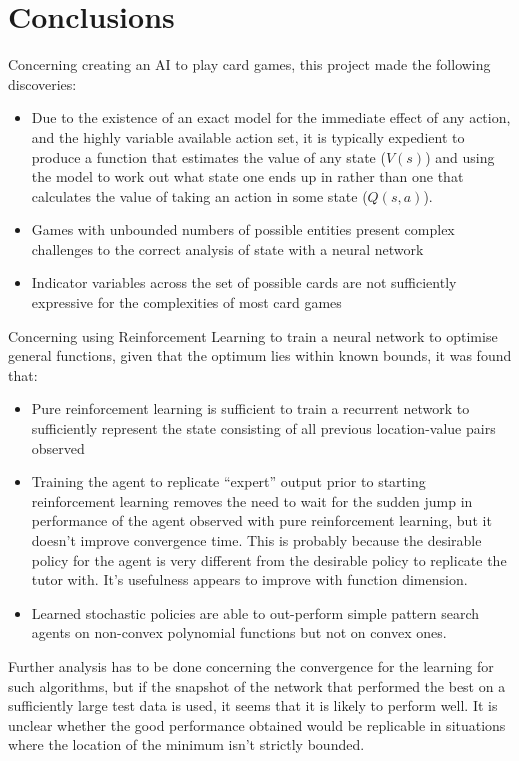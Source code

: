 \section{Conclusions}
Concerning creating an AI to play card games, this project made the following discoveries:
\begin{itemize}
\item Due to the existence of an exact model for the immediate effect of any action, and the highly variable available action set, it is typically expedient to produce a function that estimates the value of any state ($V(s)$) and using the model to work out what state one ends up in rather than one that calculates the value of taking an action in some state ($Q(s,a)$).
\item Games with unbounded numbers of possible entities present complex challenges to the correct analysis of state with a neural network 
\item Indicator variables across the set of possible cards are not sufficiently expressive for the complexities of most card games
\end{itemize}



Concerning using Reinforcement Learning to train a  neural network to optimise general functions, given that the optimum lies within known bounds, it was found that:
\begin{itemize}
\item Pure reinforcement learning is sufficient to train a recurrent network to sufficiently represent the state consisting of all previous location-value pairs observed
\item Training the agent to replicate ``expert'' output prior to starting reinforcement learning removes the need to wait for the sudden jump in performance of the agent observed with pure reinforcement learning, but it doesn't improve convergence time. This is probably because the desirable policy for the agent is very different from the desirable policy to replicate the tutor with. It's usefulness appears to improve with function dimension.
\item Learned stochastic policies are able to out-perform simple pattern search agents on non-convex polynomial functions but not on convex ones.
\end{itemize}
Further analysis has to be done concerning the convergence for the learning for such algorithms, but if the snapshot of the network that performed the best on a sufficiently large test data is used, it seems that it is likely to perform well. It is unclear whether the good performance obtained would be replicable in situations where the location of the minimum isn't strictly bounded.

